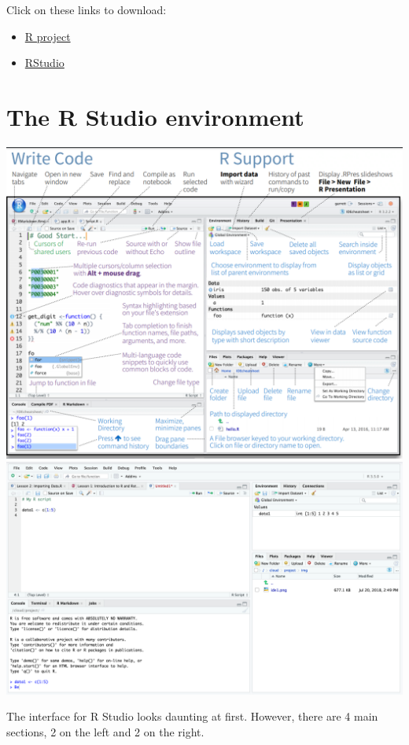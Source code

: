 \documentclass[
]{book}
\providecommand{\tightlist}{%
  \setlength{\itemsep}{0pt}\setlength{\parskip}{0pt}}
\begin{document}
Click on these links to download:

\begin{itemize}
\tightlist
\item
  \href{https://cran.r-project.org/}{R project}
\item
  \href{https://rstudio.com/}{RStudio}
\end{itemize}

\hypertarget{the-r-studio-environment}{%
\section{The R Studio environment}\label{the-r-studio-environment}}

\includegraphics{images/rstudio_ide.png}
\includegraphics{images/rstudio1.png}

The interface for R Studio looks daunting at first. However, there are 4 main sections, 2 on the left and 2 on the right.
\end{document}
